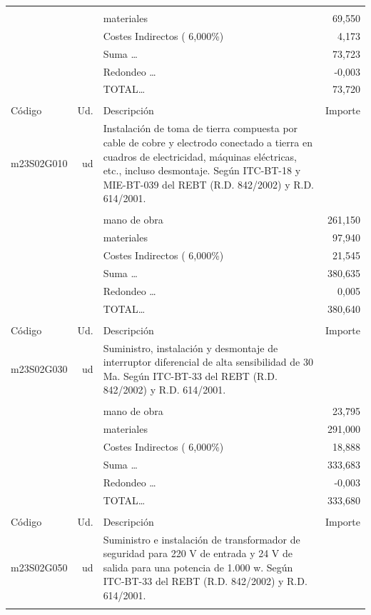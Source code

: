 \documentclass{book}%
\begin{document}
\begin{supertabular}{l r p{60mm} r}
&&&\\%
&&materiales&    69,550\\%
&&Costes Indirectos (     6,000\%)&     4,173\\%
&&Suma \ldots&    73,723\\%
&&Redondeo \ldots&    {-}0,003\\%
%
&&TOTAL\ldots&    73,720\\%
&&&\\%
Código&Ud.&Descripción&Importe\\%
\hline%
m23S02G010&ud&Instalación de toma de tierra compuesta por cable de cobre y electrodo conectado a tierra en cuadros de electricidad, máquinas eléctricas, etc., incluso desmontaje. Según ITC{-}BT{-}18 y MIE{-}BT{-}039 del REBT (R.D. 842/2002) y R.D. 614/2001.&\\%
&&&\\%
&&mano de obra&   261,150\\%
&&materiales&    97,940\\%
&&Costes Indirectos (     6,000\%)&    21,545\\%
&&Suma \ldots&   380,635\\%
&&Redondeo \ldots&     0,005\\%
%
&&TOTAL\ldots&   380,640\\%
&&&\\%
Código&Ud.&Descripción&Importe\\%
\hline%
m23S02G030&ud&Suministro, instalación y desmontaje de interruptor diferencial de alta sensibilidad de 30 Ma. Según ITC{-}BT{-}33 del REBT (R.D. 842/2002) y R.D. 614/2001.&\\%
&&&\\%
&&mano de obra&    23,795\\%
&&materiales&   291,000\\%
&&Costes Indirectos (     6,000\%)&    18,888\\%
&&Suma \ldots&   333,683\\%
&&Redondeo \ldots&    {-}0,003\\%
%
&&TOTAL\ldots&   333,680\\%
&&&\\%
Código&Ud.&Descripción&Importe\\%
\hline%
m23S02G050&ud&Suministro e instalación de transformador de seguridad para 220 V de entrada y 24 V de salida para una potencia de 1.000 w. Según ITC{-}BT{-}33 del REBT (R.D. 842/2002) y R.D. 614/2001.&\\%
&&&\\%

\end{supertabular}
\end{document}
